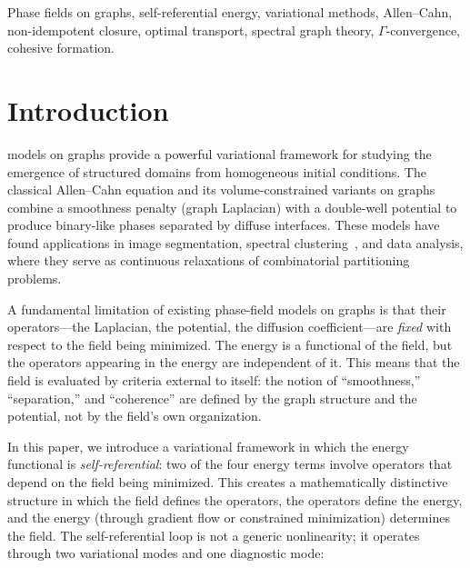 \documentclass[lettersize,journal]{IEEEtran}
\begin{document}
\begin{abstract}
improvement over standard Weyl estimates. Computational experiments on grids up to $50 \times 50$ and 32~graph families confirm theoretical predictions.
\end{abstract}

\begin{IEEEkeywords}
Phase fields on graphs, self-referential energy, variational methods, Allen--Cahn, non-idempotent closure, optimal transport, spectral graph theory, $\Gamma$-convergence, cohesive formation.
\end{IEEEkeywords}

\section{Introduction}
\label{sec:intro}

 models on graphs provide a powerful variational framework for studying the emergence of structured domains from homogeneous initial conditions. The classical Allen--Cahn equation and its volume-constrained variants on graphs~\cite{vanGennip2012} combine a smoothness penalty (graph Laplacian) with a double-well potential to produce binary-like phases separated by diffuse interfaces. These models have found applications in image segmentation, spectral clustering~\cite{ShiMalik2000}, and data analysis, where they serve as continuous relaxations of combinatorial partitioning problems.

A fundamental limitation of existing phase-field models on graphs is that their operators---the Laplacian, the potential, the diffusion coefficient---are \emph{fixed} with respect to the field being minimized. The energy is a functional of the field, but the operators appearing in the energy are independent of it. This means that the field is evaluated by criteria external to itself: the notion of ``smoothness,'' ``separation,'' and ``coherence'' are defined by the graph structure and the potential, not by the field's own organization.

In this paper, we introduce a variational framework in which the energy functional is \emph{self-referential}: two of the four energy terms involve operators that depend on the field being minimized. This creates a mathematically distinctive structure in which the field defines the operators, the operators define the energy, and the energy (through gradient flow or constrained minimization) determines the field. The self-referential loop is not a generic nonlinearity; it operates through two variational modes and one diagnostic mode:
\end{document}
